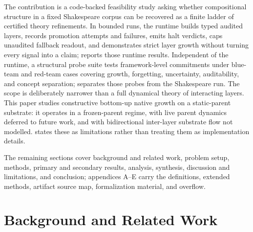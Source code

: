 \documentclass{article}
\theoremstyle{definition}
\begin{document}
The contribution is a code-backed feasibility study asking whether compositional structure in a fixed Shakespeare corpus can be recovered as a finite ladder of certified theory refinements. In bounded runs, the runtime builds typed audited layers, records promotion attempts and failures, emits halt verdicts, caps unaudited fallback readout, and demonstrates strict layer growth without turning every signal into a claim;  reports those runtime results. Independent of the runtime, a structural probe suite tests framework-level commitments under blue-team and red-team cases covering growth, forgetting, uncertainty, auditability, and concept separation;  separates those probes from the Shakespeare run. The scope is deliberately narrower than a full dynamical theory of interacting layers. This paper studies constructive bottom-up native growth on a static-parent substrate: it operates in a frozen-parent regime, with live parent dynamics deferred to future work, and with bidirectional inter-layer substrate flow not modelled.  states these as limitations rather than treating them as implementation details.

The remaining sections cover background and related work, problem setup, methods, primary and secondary results, analysis, synthesis, discussion and limitations, and conclusion; appendices A--E carry the definitions, extended methods, artifact source map, formalization material, and overflow.
 \section{Background and Related Work}\label{sec:background}
\end{document}
